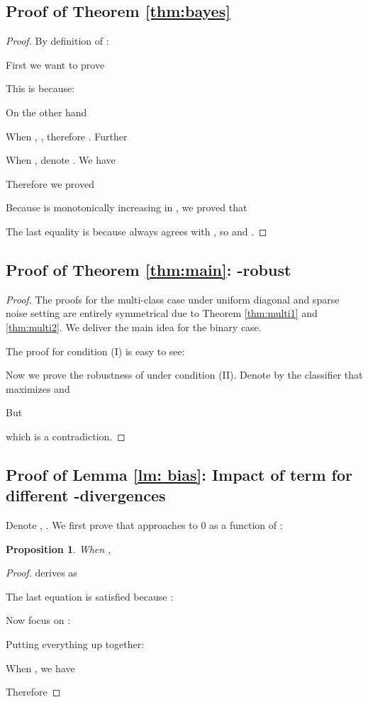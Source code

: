 \documentclass{article}
\newtheorem{proposition}[theorem]{Proposition}
\begin{document}
\subsection{Proof of Theorem \ref{thm:bayes}}
\begin{proof}
By definition of :

First we want to prove

This is because:


On the other hand

When , , therefore . Further

When , denote . We have

Therefore we proved

Because  is monotonically increasing in , we proved that

The last equality is because  always agrees with , so  and .

\end{proof}



\subsection{Proof of Theorem \ref{thm:main}: -robust}
\begin{proof}
The proofs for the multi-class case under uniform diagonal and sparse noise setting are entirely symmetrical due to Theorem \ref{thm:multi1} and \ref{thm:multi2}. We deliver the main idea for the binary case.

The proof for condition (I) is easy to see:

Now we prove the robustness of  under condition (II). Denote by  the classifier that maximizes  and 

But

which is a contradiction. 
\end{proof}





\subsection{Proof of Lemma \ref{lm: bias}: Impact of  term for different -divergences}
Denote , .
We first prove that
 approaches to 0 as a function of :
\begin{proposition}
\label{prop:pq}
When , 

\end{proposition}
\begin{proof}

 derives as

The last equation is satisfied because : 

Now focus on :

Putting everything up together:

When , we have

Therefore

\end{proof}
\end{document}
